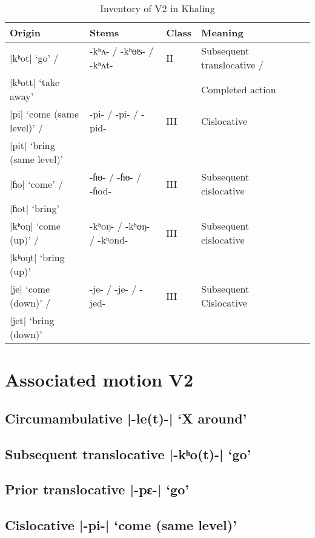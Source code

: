 \documentclass[oneside,a4paper,11pt]{article}
\newcommand{\ipa}[1]{{\phon#1}}
\newcommand{\dhatu}[2]{|\ipa{#1}| `#2'}
\begin{document}
\begin{table}[H]
\caption{Inventory of V2 in Khaling} \label{tab:khyal.v2} \centering 
\begin{tabular}{llllll}
\toprule 
Origin & Stems & Class & Meaning \\%
\midrule
\dhatu{kʰot}{go} / &  \ipa{-kʰʌ- / -kʰɵʦ- / -kʰʌt-} & II &  Subsequent translocative / \\
\dhatu{kʰott}{take away} & &&Completed action & \\
\midrule
\dhatu{pi}{come (same level)} / &  \ipa{-pi- / -pi- / -pid-} & III &  Cislocative \\
\dhatu{pit}{bring (same level)} & &&  & \\
\midrule
\dhatu{ɦo}{come} / &  \ipa{-ɦɵ- / -ɦɵ- / -ɦod-} & III &  Subsequent cislocative \\
\dhatu{ɦot}{bring} & &&  & \\
\midrule
\dhatu{kʰoŋ}{come (up)} / &  \ipa{-kʰoŋ- / -kʰɵŋ- / -kʰond-} & III &  Subsequent cislocative \\
\dhatu{kʰoŋt}{bring (up)} & &&  & \\
\midrule
\dhatu{je}{come (down)} / &  \ipa{-je- / -je- / -jed-} & III &  Subsequent Cislocative \\
\dhatu{jet}{bring (down)} & &&  & \\
\bottomrule 
\end{tabular}
\end{table}


\section{Associated motion V2}
\subsection{Circumambulative \dhatu{-le(t)-}{X around}} \label{sec:v2.le}
\subsection{Subsequent translocative \dhatu{-kʰo(t)-}{go}} \label{sec:v2.khot}
\subsection{Prior translocative \dhatu{-pɛ-}{go}} \label{sec:v2.pE}
\subsection{Cislocative \dhatu{-pi-}{come (same level)}} \label{sec:v2.pi}
\end{document}
